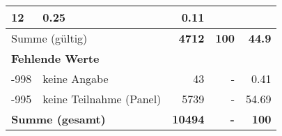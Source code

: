 \begin{longtable}{lXrrr}
       \num{12} &
       \num[round-mode=places,round-precision=2]{0.25} &
         \num[round-mode=places,round-precision=2]{0.11} \\
     \midrule
     \multicolumn{2}{l}{Summe (gültig)} &
       \textbf{\num{4712}} &
     \textbf{\num{100}} &
       \textbf{\num[round-mode=places,round-precision=2]{44.9}} \\
     \multicolumn{5}{l}{\textbf{Fehlende Werte}}\\
       -998 &
       keine Angabe &
         \num{43} &
        - &
         \num[round-mode=places,round-precision=2]{0.41} \\
       -995 &
       keine Teilnahme (Panel) &
         \num{5739} &
        - &
         \num[round-mode=places,round-precision=2]{54.69} \\
     \midrule
     \multicolumn{2}{l}{\textbf{Summe (gesamt)}} &
          \textbf{\num{10494}} &
        \textbf{-} &
        \textbf{\num{100}} \\
     \bottomrule
     \end{longtable}
     

